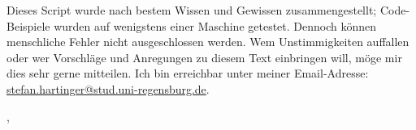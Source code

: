 Dieses Script wurde nach bestem Wissen und Gewissen zusammengestellt; Code-Beispiele wurden auf wenigstens einer Maschine getestet. Dennoch können menschliche Fehler nicht ausgeschlossen werden. Wem Unstimmigkeiten auffallen oder wer Vorschläge und Anregungen zu diesem Text einbringen will, möge mir dies sehr gerne mitteilen. Ich bin erreichbar unter meiner Email-Adresse:\\ \url{stefan.hartinger@stud.uni-regensburg.de}.
\begin{flushright}
\myName, \myVersionTime
\end{flushright}

\vfill

